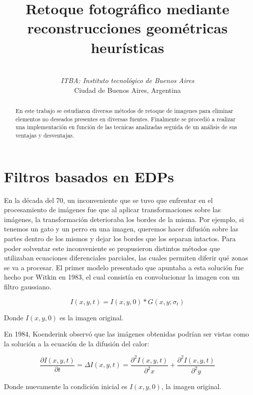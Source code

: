 \documentclass[conference]{IEEEtran}
\begin{document}
\title{Retoque fotográfico mediante reconstrucciones geométricas heurísticas}
\author{
 \\
\textit{ITBA: Instituto tecnológico de Buenos Aires}\\
Ciudad de Buenos Aires, Argentina
}
\maketitle

\begin{abstract}
En este trabajo se estudiaron
 diversos métodos de retoque de imagenes para eliminar elementos no deseados presentes en diversas fuentes. Finalmente se procedió a realizar una implementación en función de las tecnicas analizadas seguida de un análisis de sus ventajas y desventajas.
\end{abstract}

\section{Filtros basados en EDPs}
En la década del 70, un inconveniente que se tuvo que enfrentar en el procesamiento de imágenes fue que al aplicar transformaciones sobre las imágenes, la transformación deterioraba los bordes de la misma. Por ejemplo, si tenemos un gato y un perro en una imagen, queremos hacer difusión sobre las partes dentro de los mismos y dejar los bordes que los separan intactos. Para poder solventar este inconveniente se propusieron distintos métodos que utilizaban ecuaciones diferenciales parciales, las cuales permiten diferir qué zonas se va a procesar.
El primer modelo presentado que apuntaba a esta solución fue hecho por Witkin en 1983, el cual consistía en convolucionar la imagen con un filtro gaussiano.

\[ I(x,y,t) = I(x,y,0)*G(x,y;\sigma_t)  \]

Donde $I(x,y,0)$ es la imagen original.


En 1984, Koenderink observó que las imágenes obtenidas podrían ser vistas como la solución a la ecuación de la difusión del calor:

\[ \frac{\partial I(x,y,t)}{\partial t} = \Delta I(x,y,t)= \frac{\partial^2I(x,y,t)}{\partial^2x} + \frac{\partial^2I(x,y,t)}{\partial^2y}   \]

Donde nuevamente la condición inicial es $I(x,y,0)$, la imagen original.
\end{document}
